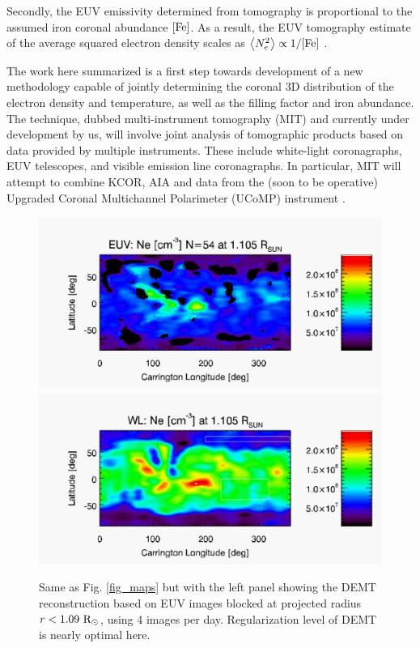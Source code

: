 \documentclass[baaa]{baaa}
\def\AvgNE2{\left<N_e^2\right>}
\begin{document}
Secondly, the EUV {emissivity} determined from tomography is proportional to the assumed iron coronal abundance $[\rm{Fe}]$. As a result, the EUV tomography estimate of the average squared electron density scales as $\AvgNE2 \propto 1/[\rm{Fe}]$ \citep{frazin_2009}.

The work here summarized is a first step towards development of a new methodology capable of jointly determining the coronal 3D distribution of the electron density and temperature, as well as the filling factor and iron abundance. The technique, dubbed multi-instrument tomography (MIT) {and currently under development by us}, will involve joint analysis of tomographic products based on data provided by multiple instruments. These include white-light coronagraphs, EUV telescopes, and visible emission line coronagraphs. In particular, MIT will attempt to combine KCOR{, AIA and data from the} (soon to be operative) Upgraded Coronal Multichannel Polarimeter (UCoMP) instrument \citep{landi_2016}.


\small

 
\clearpage

\begin{figure}[t]
  \centering
  \includegraphics[width=\columnwidth]{map_ne_aia_bloqueo109_n54.pdf}
  \includegraphics[width=\columnwidth]{map_ne_kcor.pdf}
  \caption{Same as Fig. \ref{fig_maps} but with the left panel showing the DEMT reconstruction based on EUV images blocked at projected radius $r<1.09~\rm{R}_\odot$, using 4 images per day. Regularization level of DEMT is nearly optimal here.}
  \label{fig_maps2}
\end{figure}
\end{document}
